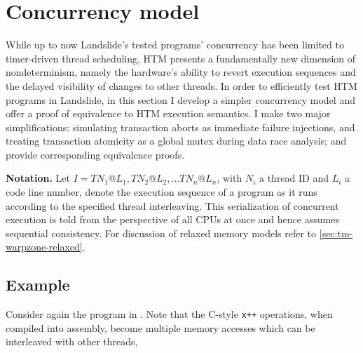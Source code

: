 
\section{Concurrency model}
\label{sec:tm-design}

While up to now Landslide's tested programs' concurrency has been limited to timer-driven thread scheduling,
HTM presents a fundamentally new dimension of nondeterminism,
namely the hardware's ability to revert execution sequences
and the delayed visibility of changes to other threads.
In order to efficiently test HTM programs in Landslide,
in this section
I develop a simpler concurrency model and offer a proof of equivalence to HTM execution semantics.
I make two major simplifications:
simulating transaction aborts as immediate failure injections,
and treating transaction atomicity as a global mutex during data race analysis;
and provide corresponding equivalence proofs.

{\bf Notation.} Let $I = TN_1@L_1, TN_2@L_2, ... TN_n@L_n$,
with $N_i$ a thread ID and $L_i$ a code line number,
denote the execution sequence of a program as it runs according to the specified thread interleaving.
This serialization of concurrent execution is told from the perspective of all CPUs at once
and hence assumes sequential consistency.
For discussion of relaxed memory models refer to \cref{sec:tm-warpzone-relaxed}.

\subsection{Example}

Consider again the program in .
Note that the C-style {\tt x++} operations, when compiled into assembly, %
become multiple memory accesses which can be interleaved with other threads,

